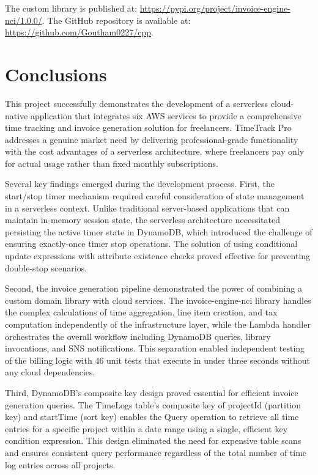 \documentclass[conference]{IEEEtran}
\begin{document}
The custom library is published at: \url{https://pypi.org/project/invoice-engine-nci/1.0.0/}. The GitHub repository is available at: \url{https://github.com/Goutham0227/cpp}.

\section{Conclusions}

This project successfully demonstrates the development of a serverless cloud-native application that integrates six AWS services to provide a comprehensive time tracking and invoice generation solution for freelancers. TimeTrack Pro addresses a genuine market need by delivering professional-grade functionality with the cost advantages of a serverless architecture, where freelancers pay only for actual usage rather than fixed monthly subscriptions.

Several key findings emerged during the development process. First, the start/stop timer mechanism required careful consideration of state management in a serverless context. Unlike traditional server-based applications that can maintain in-memory session state, the serverless architecture necessitated persisting the active timer state in DynamoDB, which introduced the challenge of ensuring exactly-once timer stop operations. The solution of using conditional update expressions with attribute existence checks proved effective for preventing double-stop scenarios.

Second, the invoice generation pipeline demonstrated the power of combining a custom domain library with cloud services. The invoice-engine-nci library handles the complex calculations of time aggregation, line item creation, and tax computation independently of the infrastructure layer, while the Lambda handler orchestrates the overall workflow including DynamoDB queries, library invocations, and SNS notifications. This separation enabled independent testing of the billing logic with 46 unit tests that execute in under three seconds without any cloud dependencies.

Third, DynamoDB's composite key design proved essential for efficient invoice generation queries. The TimeLogs table's composite key of projectId (partition key) and startTime (sort key) enables the Query operation to retrieve all time entries for a specific project within a date range using a single, efficient key condition expression. This design eliminated the need for expensive table scans and ensures consistent query performance regardless of the total number of time log entries across all projects.
\end{document}
